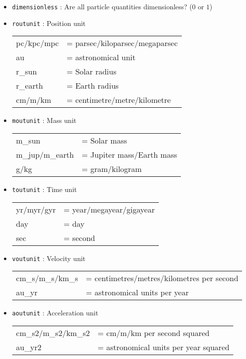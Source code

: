 \documentclass[a4paper]{article}
\newcommand{\var}[1]{\texttt{#1}}
\begin{document}
\begin{itemize}
\item \var{dimensionless} : Are all particle quantities dimensionless? ($0$ or $1$)

\item \var{routunit} : Position unit \vspace{0.1cm} \\
\begin{tabular}{ll}
pc/kpc/mpc & = parsec/kiloparsec/megaparsec \\
au         & = astronomical unit \\
r\_sun     & = Solar radius \\
r\_earth   & = Earth radius \\
cm/m/km    & = centimetre/metre/kilometre
\end{tabular}

\item \var{moutunit} : Mass unit \vspace{0.1cm} \\
\begin{tabular}{ll}
m\_sun          & = Solar mass \\
m\_jup/m\_earth & = Jupiter mass/Earth mass \\
g/kg            & = gram/kilogram
\end{tabular}


\item \var{toutunit} : Time unit \\
\begin{tabular}{ll}
yr/myr/gyr & = year/megayear/gigayear \\
day        & = day \\
sec        & = second
\end{tabular}

\item \var{voutunit} : Velocity unit \\
\begin{tabular}{ll}
cm\_s/m\_s/km\_s & = centimetres/metres/kilometres per second \\
au\_yr           & = astronomical units per year
\end{tabular}

\item \var{aoutunit} : Acceleration unit \\
\begin{tabular}{ll}
cm\_s2/m\_s2/km\_s2 & = cm/m/km per second squared \\
au\_yr2             & = astronomical units per year squared
\end{tabular}


\end{itemize}
\end{document}
